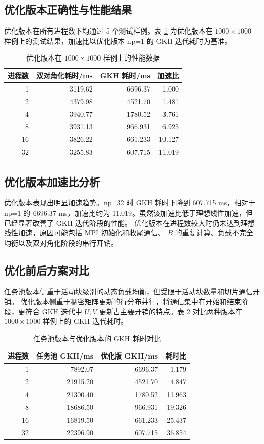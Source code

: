 \documentclass[UTF8,a4paper,10pt]{ctexart}
\begin{document}
\subsection{优化版本正确性与性能结果}
优化版本在所有进程数下均通过 5 个测试样例。表 \ref{tab:optimized} 为优化版本在
$1000\times 1000$ 样例上的测试结果，加速比以优化版本 np=1 的 GKH 迭代耗时为基准。

\begin{table}[H]
  \centering
  \begin{tabular}{rrrr}
    \toprule
    进程数 & 双对角化耗时/ms & GKH 耗时/ms & 加速比 \\
    \midrule
    1  & 3119.62 & 6696.37 & 1.000 \\
    2  & 4379.98 & 4521.70 & 1.481 \\
    4  & 3940.77 & 1780.52 & 3.761 \\
    8  & 3931.13 & 966.931 & 6.925 \\
    16 & 3826.22 & 661.233 & 10.127 \\
    32 & 3255.83 & 607.715 & 11.019 \\
    \bottomrule
  \end{tabular}
  \caption{优化版本在 $1000\times 1000$ 样例上的性能数据}
  \label{tab:optimized}
\end{table}

\subsection{优化版本加速比分析}
优化版本表现出明显加速趋势。np=32 时 GKH 耗时下降到 607.715 ms，相对于 np=1 的
6696.37 ms，加速比约为 11.019。虽然该加速比低于理想线性加速，但已经显著改善了 GKH 迭代阶段的性能。
优化版本在进程数较大时仍未达到理想线性加速，原因可能包括 MPI 初始化和收尾通信、
$B$ 的重复计算、负载不完全均衡以及双对角化阶段的串行开销。

\subsection{优化前后方案对比}
任务池版本侧重于活动块级别的动态负载均衡，但受限于活动块数量和切片通信开销。
优化版本侧重于稠密矩阵更新的行分布并行，将通信集中在开始和结束阶段，更符合 GKH 迭代中
$U,V$ 更新占主要开销的特点。表 \ref{tab:compare} 对比两种版本在 $1000\times 1000$ 样例上的 GKH 迭代耗时。

\begin{table}[H]
  \centering
  \begin{tabular}{rrrr}
    \toprule
    进程数 & 任务池 GKH/ms & 优化版 GKH/ms & 耗时比 \\
    \midrule
    1  & 7892.07  & 6696.37 & 1.179 \\
    2  & 21915.20 & 4521.70 & 4.847 \\
    4  & 21300.40 & 1780.52 & 11.963 \\
    8  & 18686.50 & 966.931 & 19.326 \\
    16 & 16819.50 & 661.233 & 25.437 \\
    32 & 22396.90 & 607.715 & 36.854 \\
    \bottomrule
  \end{tabular}
  \caption{任务池版本与优化版本的 GKH 耗时对比}
  \label{tab:compare}
\end{table}
\end{document}
